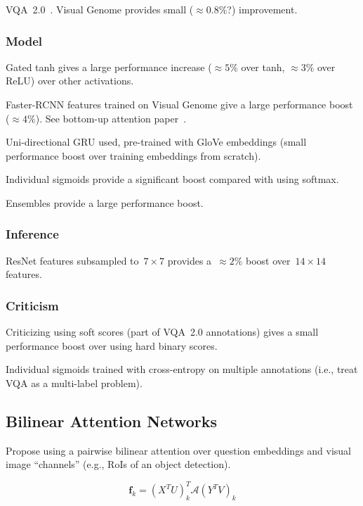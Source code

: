\documentclass[a4paper, 12pt]{article}
\begin{document}
VQA~2.0~\citet{goyal2017making}. Visual Genome provides small
($\approx 0.8\%$?) improvement.


\subsubsection{Model}

Gated tanh gives a large performance increase ($\approx 5\%$ over tanh,
$\approx 3\%$ over ReLU) over other activations.

Faster-RCNN features trained on Visual Genome give a large performance boost
($\approx 4\%$).  See bottom-up attention paper~\citet{anderson2017bottom}.

Uni-directional GRU used, pre-trained with GloVe embeddings (small performance
boost over training embeddings from scratch).

Individual sigmoids provide a significant boost compared with using softmax.

Ensembles provide a large performance boost.


\subsubsection{Inference}

ResNet features subsampled to~$7 \times 7$ provides a~$\approx 2\%$ boost
over~$14 \times 14$ features.


\subsubsection{Criticism}

Criticizing using soft scores (part of VQA~2.0 annotations) gives a small
performance boost over using hard binary scores.

Individual sigmoids trained with cross-entropy on multiple annotations (i.e.,
treat VQA as a multi-label problem).


\subsection{Bilinear Attention Networks}

Propose using a pairwise bilinear attention over question embeddings and visual
image ``channels'' (e.g., RoIs of an object detection).

\begin{equation}
\mathbf{f}_k = {(X^T U)}^T_k \mathcal{A} {(Y^T V)}_k
\end{equation}
\end{document}
